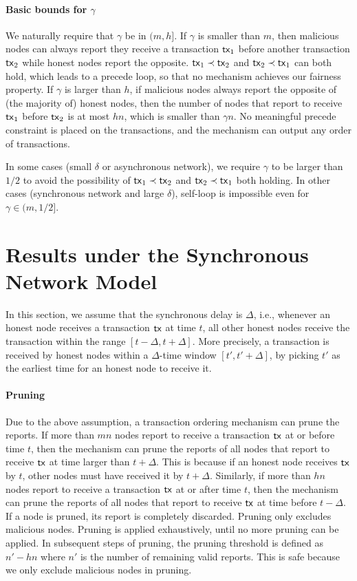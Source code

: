 \documentclass[runningheads]{llncs}
\begin{document}
\paragraph{Basic bounds for $\gamma$} We naturally require that $\gamma$ be in $(m, h]$. If $\gamma$ is smaller than $m$, then malicious nodes can always report they receive a transaction $\mathsf{tx}_1$ before another transaction $\mathsf{tx}_2$ while honest nodes report the opposite. $\mathsf{tx}_1\prec\mathsf{tx}_2$ and $\mathsf{tx}_2\prec\mathsf{tx}_1$ can both hold, which leads to a precede loop, so that no mechanism achieves our fairness property. If $\gamma$ is larger than $h$, if malicious nodes always report the opposite of (the majority of) honest nodes, then the number of nodes that report to receive $\mathsf{tx}_1$ before $\mathsf{tx}_2$ is at most $h n$, which is smaller than $\gamma n$. No meaningful precede constraint is placed on the transactions, and the mechanism can output any order of transactions. 

In some cases (small $\delta$ or asynchronous network), we require $\gamma$ to be larger than $1/2$ to avoid the possibility of $\mathsf{tx}_1\prec \mathsf{tx}_2$ and $\mathsf{tx}_2\prec \mathsf{tx}_1$ both holding. In other cases (synchronous network and large $\delta$), self-loop is impossible even for $\gamma\in (m, 1/2]$. 

\section{Results under the Synchronous Network Model}

In this section, we assume that the synchronous delay is $\Delta$, i.e., whenever an honest node receives a transaction $\mathsf{tx}$ at time $t$, all other honest nodes receive the transaction within the range $[t-\Delta, t+\Delta]$. More precisely, a transaction is received by honest nodes within a $\Delta$-time window $[t', t'+\Delta]$, by picking $t'$ as the earliest time for an honest node to receive it. 

\paragraph{Pruning} Due to the above assumption, a transaction ordering mechanism can prune the reports. If more than $mn$ nodes report to receive a transaction $\mathsf{tx}$ at or before time $t$, then the mechanism can prune the reports of all nodes that report to receive $\mathsf{tx}$ at time larger than $t+\Delta$. This is because if an honest node receives $\mathsf{tx}$ by $t$, other nodes must have received it by $t+\Delta$. Similarly, if more than $hn$ nodes report to receive a transaction $\mathsf{tx}$ at or after time $t$, then the mechanism can prune the reports of all nodes that report to receive $\mathsf{tx}$ at time before $t-\Delta$. If a node is pruned, its report is completely discarded. Pruning only excludes malicious nodes. Pruning is applied exhaustively, until no more pruning can be applied. In subsequent steps of pruning, the pruning threshold is defined as $n'-hn$ where $n'$ is the number of remaining valid reports. This is safe because we only exclude malicious nodes in pruning. 
\end{document}

